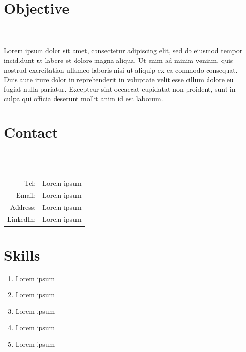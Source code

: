 \documentclass[11pt, oneside, letterpaper, titlepage]{article}
\begin{document}
\begin{tcolorbox}
	\hspace*{-0.25in}
	\begin{minipage}[t]{3in}
		\vspace*{-0.125in}
		\begin{tcolorbox}[colframe=secondary,colback=secondary,arc=0mm]
			\section*{Objective}
			\vspace*{-0.2in}
			\hrulefill\\\\
				Lorem ipsum dolor sit amet, consectetur adipiscing elit, sed do eiusmod tempor incididunt ut labore et dolore magna aliqua. Ut enim ad minim veniam, quis nostrud exercitation ullamco laboris nisi ut aliquip ex ea commodo consequat. Duis aute irure dolor in reprehenderit in voluptate velit esse cillum dolore eu fugiat nulla pariatur. Excepteur sint occaecat cupidatat non proident, sunt in culpa qui officia deserunt mollit anim id est laborum.   		
			\section*{Contact}
			\vspace*{-0.2in}
			\hrulefill\\\\
			\begin{tabular}{r l}
				Tel: & Lorem ipsum \\
				Email: & Lorem ipsum \\
				Address: & Lorem ipsum \\
				LinkedIn: & Lorem ipsum \\		
			\end{tabular}
			\section*{Skills}
			\vspace*{-0.2in}
			\hrulefill
			\begin{enumerate}[\indent {}]
				\item Lorem ipsum
				\item Lorem ipsum
				\item Lorem ipsum
				\item Lorem ipsum
				\item Lorem ipsum
			\end{enumerate}

\end{tcolorbox}
\end{minipage}
\end{tcolorbox}
\end{document}
